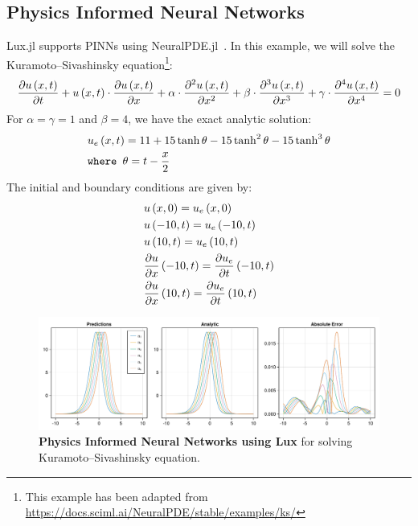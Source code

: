 \subsection{Physics Informed Neural Networks}
\label{subsec:physics_informed_neural_networks_lux}

Lux.jl supports PINNs using NeuralPDE.jl~\citep{zubov2021neuralpde}. In this example, we will solve the Kuramoto–Sivashinsky equation\footnote{This example has been adapted from \url{https://docs.sciml.ai/NeuralPDE/stable/examples/ks/}}:
%
\begin{align}
  \frac{\partial u\left(x, t\right)}{\partial t} + u\left(x, t\right) \cdot \frac{\partial u\left(x, t\right)}{\partial x} + \alpha \cdot \frac{\partial^2 u\left(x, t\right)}{\partial x^2} + \beta \cdot \frac{\partial^3 u\left(x, t\right)}{\partial x^3}  + \gamma \cdot \frac{\partial^4 u\left(x, t\right)}{\partial x^4} = 0
\end{align}
%
For $\alpha = \gamma = 1$ and $\beta = 4$, we have the exact analytic solution:
%
\begin{align}
   & u_e\left(x, t\right) = 11 + 15 \tanh \theta - 15 \tanh^2 \theta - 15 \tanh^3 \theta \\
   & \texttt{where } \theta = t - \frac{x}{2}
\end{align}
%
The initial and boundary conditions are given by:
%
\begin{align}
   & u\left(x, 0\right) = u_e\left(x, 0\right)                                                             \\
   & u\left(-10, t\right) = u_e\left(-10, t\right)                                                         \\
   & u\left(10, t\right) = u_e\left(10, t\right)                                                           \\
   & \frac{\partial u}{\partial x}\left(-10, t\right) = \frac{\partial u_e}{\partial t}\left(-10, t\right) \\
   & \frac{\partial u}{\partial x}\left(10, t\right) = \frac{\partial u_e}{\partial t}\left(10, t\right)
\end{align}
%

\begin{figure}[t]
  \centering
  \includegraphics[width=\textwidth]{../figures/lux/pinn_plot.pdf}
  \caption{\textbf{Physics Informed Neural Networks using Lux} for solving Kuramoto–Sivashinsky equation.}
  \label{fig:lux_pinn_plot}
\end{figure}

